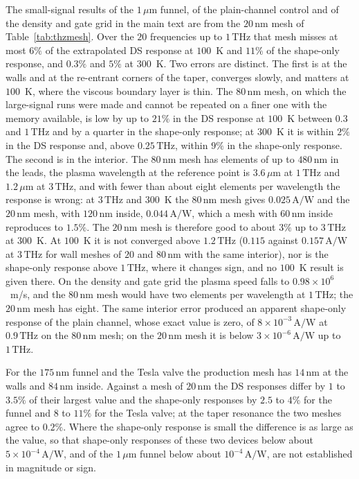 \documentclass[aps,prapplied,onecolumn,superscriptaddress,floatfix]{revtex4-2}
\newcommand{\um}{\,\mu\mathrm{m}}
\newcommand{\nm}{\,\mathrm{nm}}
\newcommand{\THz}{\,\mathrm{THz}}
\newcommand{\AW}{\,\mathrm{A/W}}
\begin{document}
The small-signal results of the $1\um$ funnel, of the plain-channel
control and of the density and gate grid in the main text are from the
$20\nm$ mesh of Table~\ref{tab:thzmesh}. Over the $20$ frequencies up to
$1\THz$ that mesh misses at most $6\%$ of the extrapolated DS response at
$100$~K and $11\%$ of the shape-only response, and $0.3\%$ and $5\%$ at
$300$~K. Two errors are distinct. The first is at the walls and at the
re-entrant corners of the taper, converges slowly, and matters at $100$~K,
where the viscous boundary layer is thin. The $80\nm$ mesh, on which the
large-signal runs were made and cannot be repeated on a finer one with the
memory available, is low by up to $21\%$ in the DS response at $100$~K
between $0.3$ and $1\THz$ and by a quarter in the shape-only response; at
$300$~K it is within $2\%$ in the DS response and, above $0.25\THz$,
within $9\%$ in the shape-only response. The second is in the interior. The $80\nm$ mesh
has elements of up to $480\nm$ in the leads, the plasma wavelength at the
reference point is $3.6\um$ at $1\THz$ and $1.2\um$ at $3\THz$, and with
fewer than about eight elements per wavelength the response is wrong: at
$3\THz$ and $300$~K the $80\nm$ mesh gives $0.025\AW$ and the $20\nm$ mesh,
with $120\nm$ inside, $0.044\AW$, which a mesh with $60\nm$ inside
reproduces to $1.5\%$. The $20\nm$ mesh is therefore good to about $3\%$
up to $3\THz$ at $300$~K. At $100$~K it is not converged above $1.2\THz$
($0.115$ against $0.157\AW$ at $3\THz$ for wall meshes of $20$ and $80\nm$
with the same interior), nor is the shape-only response above $1\THz$, where it changes sign, and no
$100$~K result is given there. On the density and gate grid the
plasma speed falls to $0.98\times10^{6}$~m/s, and the $80\nm$ mesh would
have two elements per wavelength at $1\THz$; the $20\nm$ mesh has eight.
The same interior error produced an apparent shape-only response of the
plain channel, whose exact value is zero, of $8\times10^{-3}\AW$ at
$0.9\THz$ on the $80\nm$ mesh; on the $20\nm$ mesh it is below
$3\times10^{-6}\AW$ up to $1\THz$.

For the $175\nm$ funnel and the Tesla valve the production mesh has
$14\nm$ at the walls and $84\nm$ inside. Against a mesh of $20\nm$ the DS
responses differ by $1$ to $3.5\%$ of their largest value and the
shape-only responses by $2.5$ to $4\%$ for the funnel and $8$ to $11\%$
for the Tesla valve; at the taper resonance the two meshes agree to
$0.2\%$. Where the shape-only response is small the difference is as
large as the value, so that shape-only responses of these two devices
below about $5\times10^{-4}\AW$, and of the $1\um$ funnel below about
$10^{-4}\AW$, are not established in magnitude or sign.
\end{document}
